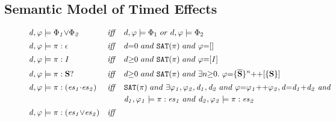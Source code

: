 \documentclass[acmsmall,review,anonymous]{acmart}\settopmatter{printfolios=true,printccs=false,printacmref=false}
\newcommand{\es}{\textcolor{black}{\ensuremath{{es}}}}
\newcommand{\effect}{\textcolor{black}{\ensuremath{\mathrm{\Phi}}}}
\newcommand{\code}[1]{{\tt{\ensuremath{\m{#1}}}}}
\newcommand{\empt}{\textcolor{black}{\ensuremath{\epsilon}}}
\newcommand{\m}{\mathit}
\begin{document}
{\subsection{Semantic Model of Timed Effects}
\label{subsec:Specification_Semantics}





\begin{figure}[h]
    \vspace{-1mm}
    \renewcommand{\arraystretch}{1}
\begin{align*} 
&\code{d, \varphi \models \effect_1 {\vee} \effect_2}  
&\m{iff}\quad 
&  d, \varphi \models \effect_1 \ or \ d, \varphi \models \effect_2
\\[0.2em]
&\code{d, \varphi \models \pi : \empt }  
&\m{iff}\quad 
&  d{=}0 \ and\  {\tt{SAT}(\pi)}  \ and \ \varphi {=} [] 
\\[0.2em]
&\code{d, \varphi \models  \pi : I }  &\m{iff}\quad 
& d {\geq} 0 \ and\ {\tt{SAT}(\pi)}  \ and \ 
\varphi {=} \code{[I]}
  \\[0.2em]
&\code{d, \varphi \models  \pi : \textbf{S}?}  &\m{iff}\quad 
& d {\geq} 0  \ and\  {\tt{SAT}(\pi)}  \ and \
\exists n {\geq} 0.\ \varphi {=} \code{\{ \overline{\textbf{S}} \}^{n} {+}{+} [\{ {\textbf{S}} \}] }
  \\[0.2em]
&\code{d, \varphi \models  \pi : (\es_1{\cdot}\es_2)}  
&\m{iff}\quad 
& {\tt{SAT}(\pi)}  \ and \ \exists \code{\varphi_1, \varphi_2, d_1, d_2}\ and\ \code{
\varphi {=} \varphi_1 {+}{+} \varphi_2, d {=} d_1 {+} d_2 \ and 
}\\
& & &
\code{d_1, \varphi_1 \models  \pi : \es_1}  \ and \ 
\code{d_2, \varphi_2 \models  \pi : \es_2}  
 \\[0.2em]
&\code{d, \varphi \models  \pi : (\es_1 {\vee} \es_2)}  
&\m{iff}\quad 

\end{align*}
\end{figure}}
\end{document}
